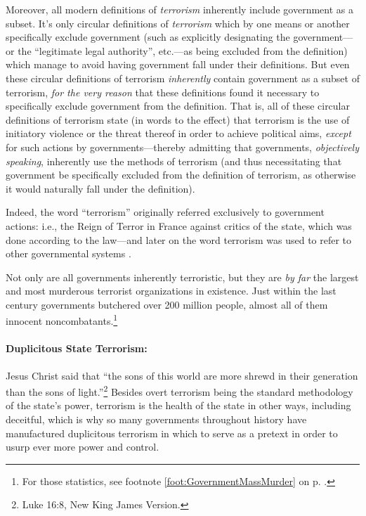 \documentclass[letterpaper,12pt]{article}
\begin{document}
Moreover, all modern definitions of \emph{terrorism} inherently include government as a subset. It's only circular definitions of \emph{terrorism} which by one means or another specifically exclude government (such as explicitly designating the government---or the ``legitimate legal authority'', etc.---as being excluded from the definition) which manage to avoid having government fall under their definitions. But even these circular definitions of terrorism \emph{inherently} contain government as a subset of terrorism, \emph{for the very reason} that these definitions found it necessary to specifically exclude government from the definition. That is, all of these circular definitions of terrorism state (in words to the effect) that terrorism is the use of initiatory violence or the threat thereof in order to achieve political aims, \emph{except} for such actions by governments---thereby admitting that governments, \emph{objectively speaking}, inherently use the methods of terrorism (and thus necessitating that government be specifically excluded from the definition of terrorism, as otherwise it would naturally fall under the definition).

Indeed, the word ``terrorism'' originally referred exclusively to government actions: i.e., the Reign of Terror in France against critics of the state, which was done according to the law---and later on the word terrorism was used to refer to other governmental systems \cite{SimpsonWeiner1989}.

Not only are all governments inherently terroristic, but they are \emph{by far} the largest and most murderous terrorist organizations in existence. Just within the last century governments butchered over 200 million people, almost all of them innocent noncombatants.\footnote{For those statistics, see footnote \ref{foot:GovernmentMassMurder} on p. \pageref{foot:GovernmentMassMurder}.}

\paragraph{Duplicitous State Terrorism:}
\label{parag:DuplicitousStateTerrorism}

Jesus Christ said that ``the sons of this world are more shrewd in their generation than the sons of light.''\footnote{Luke 16:8, New King James Version.} Besides overt terrorism being the standard methodology of the state's power, terrorism is the health of the state in other ways, including deceitful, which is why so many governments throughout history have manufactured duplicitous terrorism in which to serve as a pretext in order to usurp ever more power and control.
\end{document}
